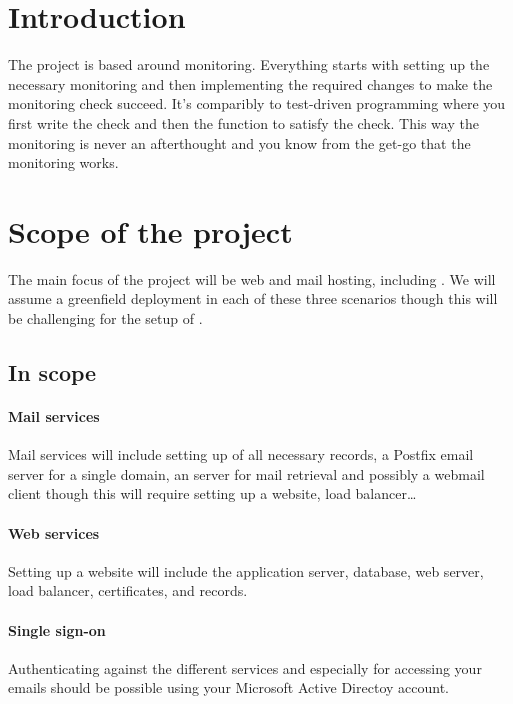 \documentclass[a4paper,12pt]{scrartcl}
\begin{document}
\maketitle



\section{Introduction}
The  project is based around monitoring.
Everything starts with setting up the necessary monitoring and then implementing the required changes to make the monitoring check succeed.
It's comparibly to test-driven programming where you first write the check and then the function to satisfy the check.
This way the monitoring is never an afterthought and you know from the get-go that the monitoring works.



\section{Scope of the project}
The main focus of the project will be web and mail hosting, including .
We will assume a greenfield deployment in each of these three scenarios though this will be challenging for the setup of .


\subsection{In scope}

\paragraph{Mail services}
Mail services will include setting up of all necessary  records, a Postfix email server for a single domain, an  server for mail retrieval and possibly a webmail client though this will require setting up a website, load balancer\ldots

\paragraph{Web services}
Setting up a website will include the application server, database, web server, load balancer, certificates, and  records.

\paragraph{Single sign-on}
Authenticating against the different services and especially for accessing your emails should be possible using your Microsoft Active Directoy account.
\end{document}
